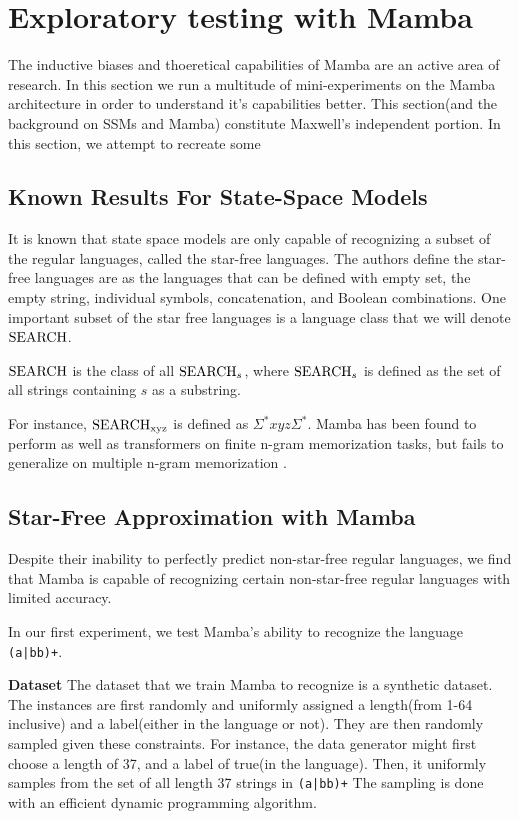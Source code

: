 \section{Exploratory testing with Mamba}
The inductive biases and thoeretical capabilities of Mamba are an active area of
research. In this section we run a multitude of mini-experiments on the Mamba
architecture in order to understand it's capabilities better.
This section(and the background on SSMs and Mamba) constitute Maxwell's
independent portion. In this section, we attempt to recreate some

\subsection{Known Results For State-Space Models}
It is known that state space models are only capable of recognizing a subset of
the regular languages\cite{ssmformal}, called the star-free languages.
The authors define the star-free languages are as the languages that can be
defined with empty set, the empty string, individual symbols, concatenation, and
Boolean combinations.
One important subset of the star free languages is a language class that we will
denote ${\text{SEARCH}}$.
\begin{definition}
    ${\text{SEARCH}}$ is the class of all ${\text{SEARCH}}_{s}$, where ${\text{SEARCH}}_{s}$ is defined
    as the set of all strings containing $s$ as a substring.
\end{definition}
For instance, ${\text{SEARCH}}_{\text{xyz}}$ is defined as $\Sigma^{*}xyz\Sigma^{*}$.
Mamba has been found to perform as well as transformers on finite n-gram
memorization tasks, but fails to generalize on multiple n-gram memorization
\cite{mambangram}.

\subsection{Star-Free Approximation with Mamba}
Despite their inability to perfectly predict non-star-free regular languages,
we find that Mamba is capable of recognizing certain non-star-free regular
languages with limited accuracy.

In our first experiment, we test Mamba's ability to recognize the language
\texttt{(a|bb)+}.

\textbf{Dataset} The dataset that we train Mamba to recognize is a synthetic
dataset.
The instances are first randomly and uniformly assigned a length(from 1-64
inclusive) and a label(either in the language or not).
They are then randomly sampled given these constraints.
For instance, the data generator might first choose a length of 37, and a label
of true(in the language).
Then, it uniformly samples from the set of all length 37 strings in
\texttt{(a|bb)+}
The sampling is done with an efficient dynamic programming algorithm.

